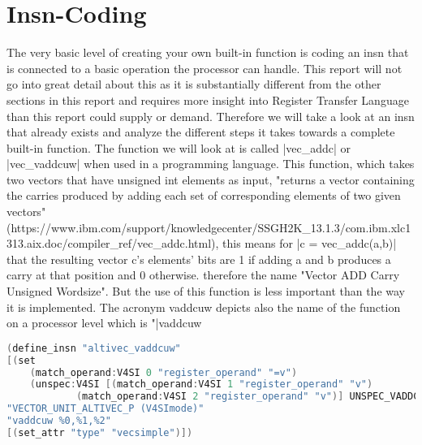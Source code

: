 \chapter{Insn-Coding}
\label{chapter:insn coding}

The very basic level of creating your own built-in function is coding an insn that is connected to a basic operation the processor can handle.
This report will not go into great detail about this as it is substantially different from the other sections in this report and requires more insight into Register Transfer Language than this report could supply or demand.
Therefore we will take a look at an insn that already exists and analyze the different steps it takes towards a complete built-in function.
The function we will look at is called |vec_addc| or |vec_vaddcuw| when used in a programming language.
This function, which takes two vectors that have unsigned int elements as input, "returns a vector containing the carries produced by adding each set of corresponding elements of two given vectors" (https://www.ibm.com/support/knowledgecenter/SSGH2K\_13.1.3/com.ibm.xlc1313.aix.doc/compiler\_ref/vec\_addc.html), this means for |c = vec_addc(a,b)| that the resulting vector c's elements' bits are 1 if adding a and b produces a carry at that position and 0 otherwise. therefore the name "Vector ADD Carry Unsigned Wordsize". But the use of this function is less important than the way it is implemented.
The acronym vaddcuw depicts also the name of the function on a processor level which is "|vaddcuw  %
\begin{lstlisting}[language=C++,basicstyle=\ttfamily\scriptsize,keywordstyle=\color{red}]
(define_insn "altivec_vaddcuw"
[(set
	(match_operand:V4SI 0 "register_operand" "=v")
	(unspec:V4SI [(match_operand:V4SI 1 "register_operand" "v")
			(match_operand:V4SI 2 "register_operand" "v")] UNSPEC_VADDCUW))]
"VECTOR_UNIT_ALTIVEC_P (V4SImode)"
"vaddcuw %0,%1,%2"
[(set_attr "type" "vecsimple")])
\end{lstlisting}

